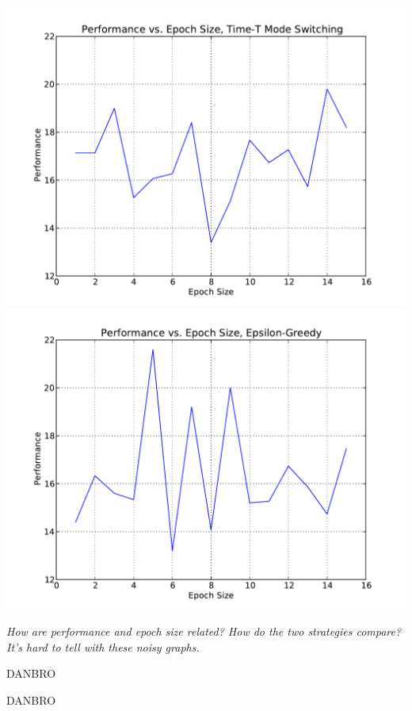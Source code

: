 \documentclass[solution, letterpaper]{cs121}
\begin{document}
\begin{center}
\includegraphics[scale=0.8]{source/perf-v-epoch-mode-switch.pdf}
\includegraphics[scale=0.8]{source/perf-v-epoch-greedy.pdf}
\end{center}

\emph{How are performance and epoch size related? How do the two strategies compare? It's hard to tell with these noisy graphs.}

\subproblem{} %
DANBRO

\subproblem{} %
DANBRO
\end{document}
